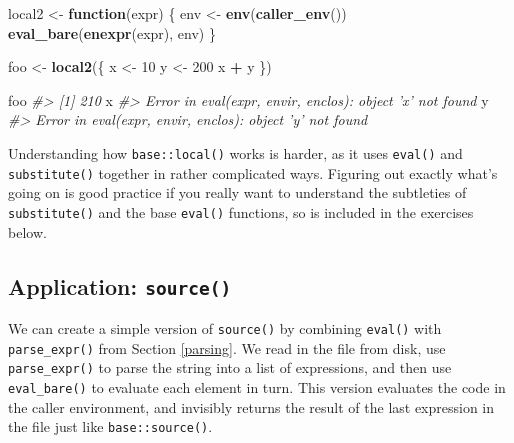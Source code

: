 \documentclass[]{book}
\makeatletter
\newenvironment{Shaded}{\begin{snugshade}}{\end{snugshade}}
\newcommand{\CommentTok}[1]{\textcolor[rgb]{0.37,0.37,0.37}{\textit{#1}}}
\newcommand{\ControlFlowTok}[1]{\textcolor[rgb]{0.27,0.27,0.27}{\textbf{#1}}}
\newcommand{\DecValTok}[1]{\textcolor[rgb]{0.06,0.06,0.06}{#1}}
\newcommand{\KeywordTok}[1]{\textcolor[rgb]{0.27,0.27,0.27}{\textbf{#1}}}
\newcommand{\NormalTok}[1]{#1}
\newcommand{\OperatorTok}[1]{\textcolor[rgb]{0.43,0.43,0.43}{\textbf{#1}}}
\newcommand{\StringTok}[1]{\textcolor[rgb]{0.5,0.5,0.5}{#1}}
\newcommand{\indexc}[1]{\index{#1@\texttt{#1}}}
\makeatother
\begin{document}
\begin{Shaded}
\begin{Highlighting}[]
\NormalTok{local2 <-}\StringTok{ }\ControlFlowTok{function}\NormalTok{(expr) \{}
\NormalTok{  env <-}\StringTok{ }\KeywordTok{env}\NormalTok{(}\KeywordTok{caller_env}\NormalTok{())}
  \KeywordTok{eval_bare}\NormalTok{(}\KeywordTok{enexpr}\NormalTok{(expr), env)}
\NormalTok{\}}

\NormalTok{foo <-}\StringTok{ }\KeywordTok{local2}\NormalTok{(\{}
\NormalTok{  x <-}\StringTok{ }\DecValTok{10}
\NormalTok{  y <-}\StringTok{ }\DecValTok{200}
\NormalTok{  x }\OperatorTok{+}\StringTok{ }\NormalTok{y}
\NormalTok{\})}

\NormalTok{foo}
\CommentTok{#> [1] 210}
\NormalTok{x}
\CommentTok{#> Error in eval(expr, envir, enclos): object 'x' not found}
\NormalTok{y}
\CommentTok{#> Error in eval(expr, envir, enclos): object 'y' not found}
\end{Highlighting}
\end{Shaded}

Understanding how \texttt{base::local()} works is harder, as it uses \texttt{eval()} and \texttt{substitute()} together in rather complicated ways. Figuring out exactly what's going on is good practice if you really want to understand the subtleties of \texttt{substitute()} and the base \texttt{eval()} functions, so is included in the exercises below.

\hypertarget{application-source}{%
\subsection{\texorpdfstring{Application: \texttt{source()}}{Application: source()}}\label{application-source}}

\indexc{source()}

We can create a simple version of \texttt{source()} by combining \texttt{eval()} with \texttt{parse\_expr()} from Section \ref{parsing}. We read in the file from disk, use \texttt{parse\_expr()} to parse the string into a list of expressions, and then use \texttt{eval\_bare()} to evaluate each element in turn. This version evaluates the code in the caller environment, and invisibly returns the result of the last expression in the file just like \texttt{base::source()}.
\end{document}

